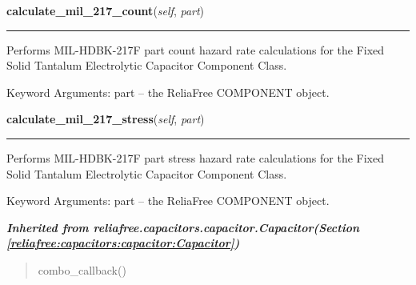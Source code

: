 \hspace{.8\funcindent}\begin{boxedminipage}{\funcwidth}

    \raggedright \textbf{calculate\_mil\_217\_count}(\textit{self}, \textit{part})

    \vspace{-1.5ex}

    \rule{\textwidth}{0.5\fboxrule}
\setlength{\parskip}{2ex}
    Performs MIL-HDBK-217F part count hazard rate calculations for the 
    Fixed Solid Tantalum Electrolytic Capacitor Component Class.

    Keyword Arguments: part -- the ReliaFree COMPONENT object.

\setlength{\parskip}{1ex}
    \end{boxedminipage}

    \label{reliafree:capacitors:electrolytic:TantalumSolid:calculate_mil_217_stress}

    \vspace{0.5ex}

\hspace{.8\funcindent}\begin{boxedminipage}{\funcwidth}

    \raggedright \textbf{calculate\_mil\_217\_stress}(\textit{self}, \textit{part})

    \vspace{-1.5ex}

    \rule{\textwidth}{0.5\fboxrule}
\setlength{\parskip}{2ex}
    Performs MIL-HDBK-217F part stress hazard rate calculations for the 
    Fixed Solid Tantalum Electrolytic Capacitor Component Class.

    Keyword Arguments: part -- the ReliaFree COMPONENT object.

\setlength{\parskip}{1ex}
    \end{boxedminipage}


\large{\textbf{\textit{Inherited from reliafree.capacitors.capacitor.Capacitor\textit{(Section \ref{reliafree:capacitors:capacitor:Capacitor})}}}}

\begin{quote}
combo\_callback()
\end{quote}
